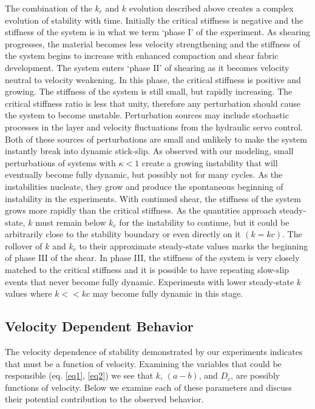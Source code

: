 The combination of the $k_c$ and $k$ evolution described above creates a complex evolution of stability with time. Initially the critical stiffness is negative and the stiffness of the system is in what we term `phase I' of the experiment. As shearing progresses, the material becomes less velocity strengthening and the stiffness of the system begins to increase with enhanced compaction and shear fabric development. The system enters `phase II' of shearing as it becomes velocity neutral to velocity weakening. In this phase, the critical stiffness is positive and growing. The stiffness of the system is still small, but rapidly increasing. The critical stiffness ratio is less that unity, therefore any perturbation should cause the system to become unstable. Perturbation sources may include stochastic processes in the layer and velocity fluctuations from the hydraulic servo control. Both of these sources of perturbations are small and unlikely to make the system instantly break into dynamic stick-slip. As observed with our modeling, small perturbations of systems with $\kappa<1$ create a growing instability that will eventually become fully dynamic, but possibly not for many cycles. As the instabilities nucleate, they grow and produce the spontaneous beginning of instability in the experiments. With continued shear, the stiffness of the system grows more rapidly than the critical stiffness. As the quantities approach steady-state, $k$ must remain below $k_c$ for the instability to continue, but it could be arbitrarily close to the stability boundary or even directly on it $(k=kc)$. The rollover of $k$ and $k_c$ to their approximate steady-state values marks the beginning of phase III of the shear. In phase III, the stiffness of the system is very closely matched to the critical stiffness and it is possible to have repeating slow-slip events that never become fully dynamic. Experiments with lower steady-state $k$ values where $k<<kc$ may become fully dynamic in this stage.

\subsection{Velocity Dependent Behavior}
The velocity dependence of stability demonstrated by our experiments indicates that  must be a function of velocity. Examining the variables that could be responsible (eq. \ref{eq1}, \ref{eq2}) we see that $k$, $(a-b)$, and $D_c$, are possibly functions of velocity. Below we examine each of these parameters and discuss their potential contribution to the observed behavior.

